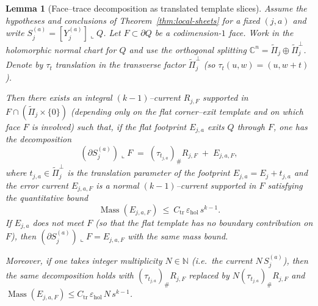 \documentclass[11pt]{article}
\numberwithin{equation}{section}  %
\theoremstyle{plain}
\newtheorem{lemma}[theorem]{Lemma}
\theoremstyle{definition}
\theoremstyle{remark}
\newcommand{\C}{\mathbb{C}}
\newcommand{\N}{\mathbb{N}}
\DeclareMathOperator{\Mass}{Mass}
\begin{document}
\begin{lemma}[Face--trace decomposition as translated template slices]\label{lem:face-trace-decomposition}
Assume the hypotheses and conclusions of Theorem~\ref{thm:local-sheets} for a fixed $(j,a)$ and write
$S_{j}^{(a)}=[Y_{j}^{(a)}]\llcorner Q$.
Let $F\subset \partial Q$ be a codimension-$1$ face.  Work in the holomorphic normal chart for $Q$ and
use the orthogonal splitting $\C^n=\widetilde\Pi_j\oplus \widetilde\Pi_j^\perp$.
Denote by $\tau_t$ translation in the transverse factor $\widetilde\Pi_j^\perp$ (so $\tau_t(u,w)=(u,w+t)$).

\smallskip\noindent
Then there exists an integral $(k\!-\!1)$--current $R_{j,F}$ supported in $F\cap(\widetilde\Pi_j\times\{0\})$
(depending only on the \emph{flat} corner--exit template and on which face $F$ is involved) such that, if the
flat footprint $E_{j,a}$ exits $Q$ through $F$, one has the decomposition
\[
(\partial S_{j}^{(a)})\llcorner F \;=\; (\tau_{t_{j,a}})_\# R_{j,F}\;+\;E_{j,a,F},
\]
where $t_{j,a}\in \widetilde\Pi_j^\perp$ is the translation parameter of the footprint $E_{j,a}=E_j+t_{j,a}$ and
the error current $E_{j,a,F}$ is a normal $(k\!-\!1)$--current supported in $F$ satisfying the quantitative bound
\[
\Mass(E_{j,a,F})\ \le\ C_{\mathrm{tr}}\,\varepsilon_{\mathrm{hol}}\,s^{k-1}.
\]
If $E_{j,a}$ does \emph{not} meet $F$ (so that the flat template has no boundary contribution on $F$), then
$(\partial S_{j}^{(a)})\llcorner F=E_{j,a,F}$ with the same mass bound.

\smallskip\noindent
Moreover, if one takes integer multiplicity $N\in\N$ (i.e.\ the current $N\,S_{j}^{(a)}$), then the same
decomposition holds with $(\tau_{t_{j,a}})_\# R_{j,F}$ replaced by $N(\tau_{t_{j,a}})_\# R_{j,F}$ and
$\Mass(E_{j,a,F})\le C_{\mathrm{tr}}\,\varepsilon_{\mathrm{hol}}\,N\,s^{k-1}$.
\end{lemma}
\end{document}
